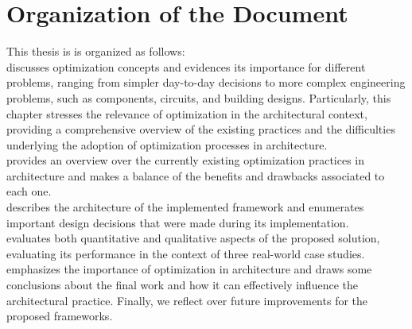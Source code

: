 \section{Organization of the Document}
This thesis is is organized as follows: \\ \textbf{} discusses optimization concepts and evidences its importance for different problems, ranging from simpler day-to-day decisions to more complex engineering problems, such as components, circuits, and building designs. Particularly, this chapter stresses the relevance of optimization in the architectural context, providing a comprehensive overview of the existing practices and the difficulties underlying the adoption of optimization processes in architecture. \\
\textbf{} provides an overview over the currently existing optimization practices in architecture and makes a balance of the benefits and drawbacks associated to each one.  \\
\textbf{} describes the architecture of the implemented framework and enumerates important design decisions that were made during its implementation. \\
\textbf{} evaluates both quantitative and qualitative aspects of the proposed solution, evaluating its performance in the context of three real-world case studies. \\
\textbf{} emphasizes the importance of optimization in architecture and draws some conclusions about the final work and how it can effectively influence the architectural practice. Finally, we reflect over future improvements for the proposed frameworks. \\
